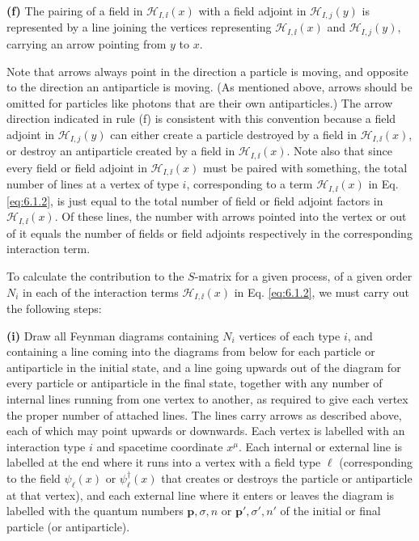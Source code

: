 \noindent\textbf{(f)} The pairing of a field in $\mathcal H_{I,\ii}(x)$ with a
field adjoint in $\mathcal H_{I,j}(y)$ is represented by a line joining the
vertices representing $\mathcal H_{I,\ii}(x)$ and $\mathcal H_{I,j}(y)$,
carrying an arrow pointing from $y$ to $x$.

Note that arrows always point in the direction a particle is moving, and
opposite to the direction an antiparticle is moving. (As mentioned above,
arrows should be omitted for particles like photons that are their own
antiparticles.) The arrow direction indicated in rule (f) is consistent with
this convention because a field adjoint in $\mathcal H_{I,j}(y)$ can either
create a particle destroyed by a field in $\mathcal H_{I,\ii}(x)$, or destroy an
antiparticle created by a field in $\mathcal H_{I,\ii}(x)$. Note also that since
every field or field adjoint in $\mathcal H_{I,\ii}(x)$ must be paired with
something, the total number of lines at a vertex of type $i$, corresponding to
a term $\mathcal H_{I,\ii}(x)$ in Eq. \eqref{eq:6.1.2}, is just equal to the total number
of field or field adjoint factors in $\mathcal H_{I,\ii}(x)$. Of these lines, the
number with arrows pointed into the vertex or out of it equals the number of
fields or field adjoints respectively in the corresponding interaction term.

To calculate the contribution to the $S$-matrix for a given process, of a given
order $N_i$ in each of the interaction terms $\mathcal H_{I,\ii}(x)$ in Eq.
\eqref{eq:6.1.2}, we must carry out the following steps:

\noindent\textbf{(i)} Draw all Feynman diagrams containing $N_i$ vertices of
each type $i$, and containing a line coming into the diagrams from below for
each particle or antiparticle in the initial state, and a line going upwards
out of the diagram for every particle or antiparticle in the final state,
together with any number of internal lines running from one vertex to another,
as required to give each vertex the proper number of attached lines. The lines
carry arrows as described above, each of which may point upwards or downwards.
Each vertex is labelled with an interaction type $i$ and spacetime coordinate
$x^\mu$. Each internal or external line is labelled at the end where it runs
into a vertex with a field type $\ell$ (corresponding to the field
$\psi_\ell(x)$ or $\psi_\ell^\dagger(x)$ that creates or destroys the particle
or antiparticle at that vertex), and each external line where it enters or
leaves the diagram is labelled with the quantum numbers $\mathbf p,\sigma,n$
or $\mathbf p',\sigma',n'$ of the initial or final particle (or antiparticle).

